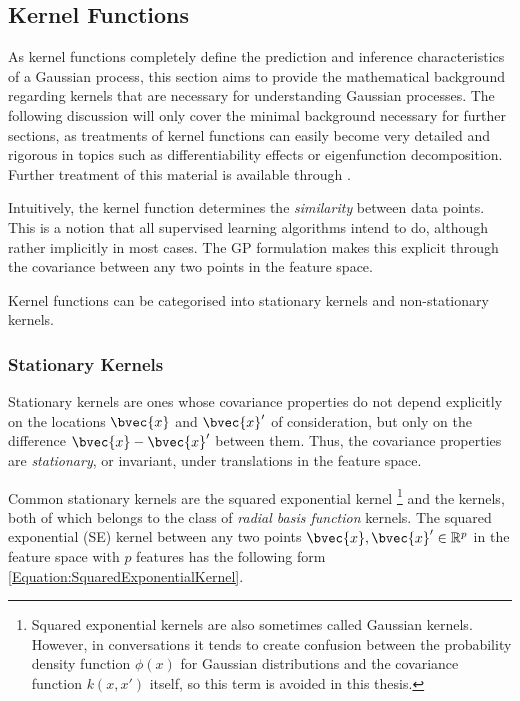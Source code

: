 			\FloatBarrier
			
		\subsection{Kernel Functions}
		\label{Background:GaussianProcesses:KernelFunctions}

			As kernel functions completely define the prediction and inference characteristics of a Gaussian process, this section aims to provide the mathematical background regarding kernels that are necessary for understanding Gaussian processes. The following discussion will only cover the minimal background necessary for further sections, as treatments of kernel functions can easily become very detailed and rigorous in topics such as differentiability effects or eigenfunction decomposition. Further treatment of this material is available through \cite{GaussianProcessForMachineLearning}. 
			
			Intuitively, the kernel function determines the \textit{similarity} between data points. This is a notion that all supervised learning algorithms intend to do, although rather implicitly in most cases. The GP formulation makes this explicit through the covariance between any two points in the feature space.
			
			Kernel functions can be categorised into stationary kernels and non-stationary kernels.
						
			\subsubsection{Stationary Kernels}
			
				Stationary kernels are ones whose covariance properties do not depend explicitly on the locations $\bvec{x}$ and $\bvec{x}'$ of consideration, but only on the difference $\bvec{x} - \bvec{x}'$ between them. Thus, the covariance properties are \textit{stationary}, or invariant, under translations in the feature space.
				
				Common stationary kernels are the squared exponential kernel \footnote{Squared exponential kernels are also sometimes called Gaussian kernels. However, in conversations it tends to create confusion between the probability density function $\phi(x)$ for Gaussian distributions and the covariance function $k(x, x')$ itself, so this term is avoided in this thesis.} and the \matern kernels, both of which belongs to the class of \textit{radial basis function} kernels. The squared exponential (SE) kernel between any two points $\bvec{x}, \bvec{x}' \in \mathbb{R}^{p}$ in the feature space with $p$ features has the following form \eqref{Equation:SquaredExponentialKernel}.
				
